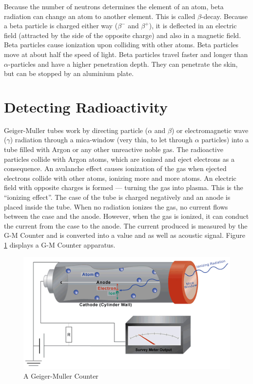 Because the number of neutrons determines the element of an atom, beta radiation can change an atom to another element. This is called $\beta$-decay. Because a beta particle is charged either way ($\beta^-$ and $\beta^+$), it is deflected in an electric field (attracted by the side of the opposite charge) and also in a magnetic field. Beta particles cause ionization upon colliding with other atoms. Beta particles move at about half the speed of light. Beta particles travel faster and longer than $\alpha$-particles and have a higher penetration depth. They can penetrate the skin, but can be stopped by an aluminium plate.

\chapter*{Detecting Radioactivity}

Geiger-Muller tubes work by directing particle ($\alpha$ and $\beta$) or electromagnetic wave ($\gamma$) radiation through a mica-window (very thin, to let through $\alpha$ particles) into a tube filled with Argon or any other unreactive noble gas. The radioactive particles collide with Argon atoms, which are ionized and eject electrons as a consequence. An avalanche effect causes ionization of the gas when ejected electrons collide with other atoms, ionizing more and more atoms. An electric field with opposite charges is formed --- turning the gas into plasma. This is the ``ionizing effect''. The case of the tube is charged negatively and an anode is placed inside the tube. When no radiation ionizes the gas, no current flows between the case and the anode. However, when the gas is ionized, it can conduct the current from the case to the anode. The current produced is measured by the G-M Counter and is converted into a value and as well as acoustic signal. Figure \ref{fig:gm} displays a G-M Counter apparatus.

\begin{figure}[b!]
  \vspace{\baselineskip}
  \centering
  \includegraphics[scale=0.8]{img/gm}
  \caption{A Geiger-Muller Counter}
  \label{fig:gm}
\end{figure}


